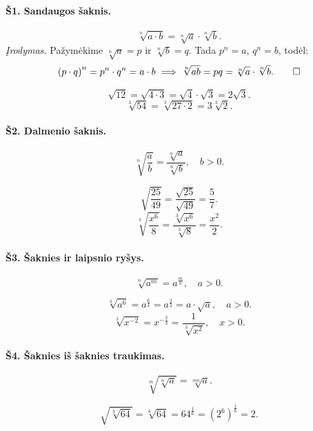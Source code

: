 \paragraph{Š1. Sandaugos šaknis.}
\[
    \sqrt[n]{a \cdot b} = \sqrt[n]{a} \cdot \sqrt[n]{b}.
\]
\textit{Įrodymas.} Pažymėkime $\sqrt[n]{a} = p$ ir $\sqrt[n]{b} = q$.
Tada $p^n = a$, $q^n = b$, todėl:
\[
    \left(p \cdot q\right)^n = p^n \cdot q^n = a \cdot b
    \implies \sqrt[n]{ab} = pq = \sqrt[n]{a} \cdot \sqrt[n]{b}. \qed
\]

\begin{example}
\[
    \sqrt{12} = \sqrt{4 \cdot 3} = \sqrt{4} \cdot \sqrt{3} = 2\sqrt{3}.
\]
\[
    \sqrt[3]{54} = \sqrt[3]{27 \cdot 2} = 3\sqrt[3]{2}.
\]
\end{example}

\paragraph{Š2. Dalmenio šaknis.}
\[
    \sqrt[n]{\frac{a}{b}} = \frac{\sqrt[n]{a}}{\sqrt[n]{b}}, \quad b > 0.
\]

\begin{example}
\[
    \sqrt{\frac{25}{49}} = \frac{\sqrt{25}}{\sqrt{49}} = \frac{5}{7}.
\]
\[
    \sqrt[3]{\frac{x^6}{8}} = \frac{\sqrt[3]{x^6}}{\sqrt[3]{8}}
    = \frac{x^2}{2}.
\]
\end{example}

\paragraph{Š3. Šaknies ir laipsnio ryšys.}
\[
    \sqrt[n]{a^m} = a^{\frac{m}{n}}, \quad a > 0.
\]

\begin{example}
\[
    \sqrt[4]{a^6} = a^{\frac{6}{4}} = a^{\frac{3}{2}}
    = a \cdot \sqrt{a}, \quad a > 0.
\]
\[
    \sqrt[3]{x^{-2}} = x^{-\frac{2}{3}} = \frac{1}{\sqrt[3]{x^2}},
    \quad x > 0.
\]
\end{example}

\paragraph{Š4. Šaknies iš šaknies traukimas.}
\[
    \sqrt[m]{\sqrt[n]{a}} = \sqrt[mn]{a}.
\]

\begin{example}
\[
    \sqrt{\sqrt[3]{64}} = \sqrt[6]{64} = 64^{\frac{1}{6}}
    = (2^6)^{\frac{1}{6}} = 2.
\]
\end{example}

